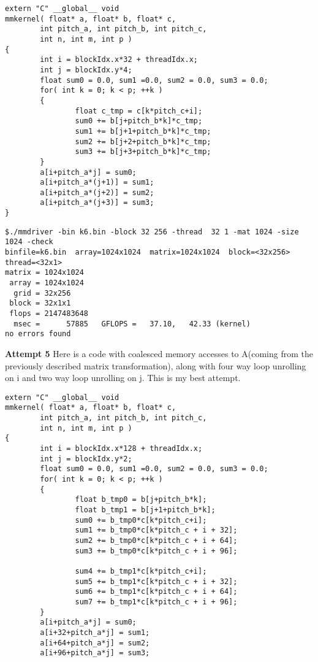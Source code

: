 \documentclass[11pt]{article}
\begin{document}
\begin{enumerate}
\begin{lstlisting}
extern "C" __global__ void
mmkernel( float* a, float* b, float* c,
        int pitch_a, int pitch_b, int pitch_c,
        int n, int m, int p )
{
        int i = blockIdx.x*32 + threadIdx.x;
        int j = blockIdx.y*4;
        float sum0 = 0.0, sum1 =0.0, sum2 = 0.0, sum3 = 0.0;
        for( int k = 0; k < p; ++k )
        {
                float c_tmp = c[k*pitch_c+i];
                sum0 += b[j+pitch_b*k]*c_tmp;
                sum1 += b[j+1+pitch_b*k]*c_tmp;
                sum2 += b[j+2+pitch_b*k]*c_tmp;
				sum3 += b[j+3+pitch_b*k]*c_tmp;
        }
        a[i+pitch_a*j] = sum0;
        a[i+pitch_a*(j+1)] = sum1;
        a[i+pitch_a*(j+2)] = sum2;
        a[i+pitch_a*(j+3)] = sum3;
}
\end{lstlisting}

\begin{lstlisting}
$./mmdriver -bin k6.bin -block 32 256 -thread  32 1 -mat 1024 -size 1024 -check
binfile=k6.bin  array=1024x1024  matrix=1024x1024  block=<32x256>  thread=<32x1>
matrix = 1024x1024
 array = 1024x1024
  grid = 32x256
 block = 32x1x1
 flops = 2147483648
  msec =      57885   GFLOPS =   37.10,   42.33 (kernel)
no errors found
\end{lstlisting}

\textbf{Attempt 5}
Here is a code with coalesced memory accesses to A(coming from the previously described matrix transformation), along with four way loop unrolling on i and two way loop unrolling on j. This is my best attempt.

\begin{lstlisting}
extern "C" __global__ void
mmkernel( float* a, float* b, float* c,
        int pitch_a, int pitch_b, int pitch_c,
        int n, int m, int p )
{
        int i = blockIdx.x*128 + threadIdx.x;
        int j = blockIdx.y*2;
        float sum0 = 0.0, sum1 =0.0, sum2 = 0.0, sum3 = 0.0;
        for( int k = 0; k < p; ++k )
        {
                float b_tmp0 = b[j+pitch_b*k];
                float b_tmp1 = b[j+1+pitch_b*k];
                sum0 += b_tmp0*c[k*pitch_c+i];
                sum1 += b_tmp0*c[k*pitch_c + i + 32];
                sum2 += b_tmp0*c[k*pitch_c + i + 64];
                sum3 += b_tmp0*c[k*pitch_c + i + 96];
                
                sum4 += b_tmp1*c[k*pitch_c+i];
				sum5 += b_tmp1*c[k*pitch_c + i + 32];
                sum6 += b_tmp1*c[k*pitch_c + i + 64];
                sum7 += b_tmp1*c[k*pitch_c + i + 96];
        }
        a[i+pitch_a*j] = sum0;
        a[i+32+pitch_a*j] = sum1;
        a[i+64+pitch_a*j] = sum2;
        a[i+96+pitch_a*j] = sum3;
        

\end{lstlisting}
\end{enumerate}
\end{document}
